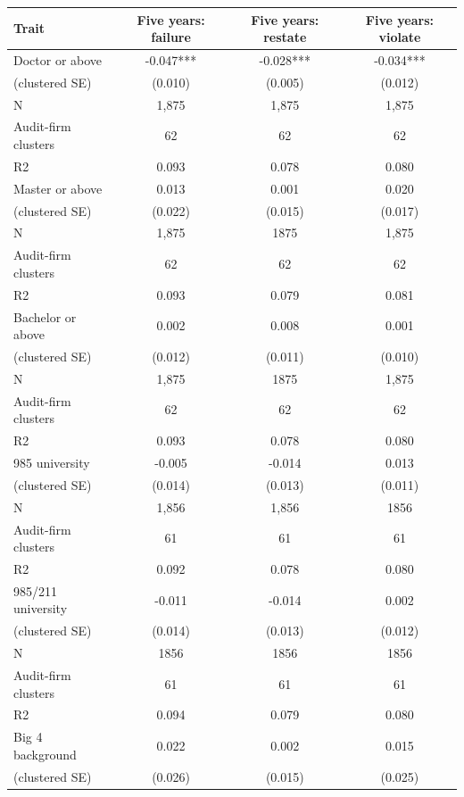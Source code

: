 \documentclass[10pt]{article}
\begin{document}
\begin{minipage}{19cm}\fontsize{10}{12}\selectfont\setlength{\tabcolsep}{4pt}\renewcommand{\arraystretch}{1.12}


\centering
{}
\begin{threeparttable}
\begin{tabular}{p{}ccc}
\toprule
Trait & Five years: failure & Five years: restate & Five years: violate \\
\midrule
Doctor or above & -0.047*** & -0.028*** & -0.034*** \\
(clustered SE) & (0.010) & (0.005) & (0.012) \\
N & 1,875 & 1,875 & 1,875 \\
Audit-firm clusters & 62 & 62 & 62 \\
R2 & 0.093 & 0.078 & 0.080 \\
Master or above & 0.013 & 0.001 & 0.020 \\
(clustered SE) & (0.022) & (0.015) & (0.017) \\
N & 1,875 & 1875 & 1,875 \\
Audit-firm clusters & 62 & 62 & 62 \\
R2 & 0.093 & 0.079 & 0.081 \\
Bachelor or above & 0.002 & 0.008 & 0.001 \\
(clustered SE) & (0.012) & (0.011) & (0.010) \\
N & 1,875 & 1875 & 1,875 \\
Audit-firm clusters & 62 & 62 & 62 \\
R2 & 0.093 & 0.078 & 0.080 \\
985 university & -0.005 & -0.014 & 0.013 \\
(clustered SE) & (0.014) & (0.013) & (0.011) \\
N & 1,856 & 1,856 & 1856 \\
Audit-firm clusters & 61 & 61 & 61 \\
R2 & 0.092 & 0.078 & 0.080 \\
985/211 university & -0.011 & -0.014 & 0.002 \\
(clustered SE) & (0.014) & (0.013) & (0.012) \\
N & 1856 & 1856 & 1856 \\
Audit-firm clusters & 61 & 61 & 61 \\
R2 & 0.094 & 0.079 & 0.080 \\
Big 4 background & 0.022 & 0.002 & 0.015 \\
(clustered SE) & (0.026) & (0.015) & (0.025) \\

\end{tabular}
\end{threeparttable}
\end{minipage}
\end{document}
